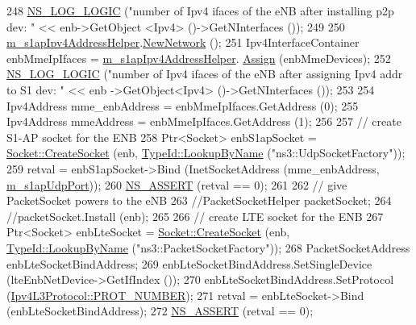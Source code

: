 \begin{DoxyCode}
248   \hyperlink{group__logging_ga88acd260151caf2db9c0fc84997f45ce}{NS\_LOG\_LOGIC} (\textcolor{stringliteral}{"number of Ipv4 ifaces of the eNB after installing p2p dev: "} << enb->GetObject
      <Ipv4> ()->GetNInterfaces ());  
249 
250   \hyperlink{classns3_1_1PointToPointEpcHelper_a0c26058a4a24008dbfe7023ebc6a00af}{m\_s1apIpv4AddressHelper}.\hyperlink{classns3_1_1Ipv4AddressHelper_a3277d133ef0d2669934a16a8206ba8e4}{NewNetwork} ();
251   Ipv4InterfaceContainer enbMmeIpIfaces = \hyperlink{classns3_1_1PointToPointEpcHelper_a0c26058a4a24008dbfe7023ebc6a00af}{m\_s1apIpv4AddressHelper}.
      \hyperlink{classns3_1_1Ipv4AddressHelper_af8e7f4a1a7e74c00014a1eac445a27af}{Assign} (enbMmeDevices);
252   \hyperlink{group__logging_ga88acd260151caf2db9c0fc84997f45ce}{NS\_LOG\_LOGIC} (\textcolor{stringliteral}{"number of Ipv4 ifaces of the eNB after assigning Ipv4 addr to S1 dev: "} << enb
      ->GetObject<Ipv4> ()->GetNInterfaces ());
253   
254   Ipv4Address mme\_enbAddress = enbMmeIpIfaces.GetAddress (0);
255   Ipv4Address mmeAddress = enbMmeIpIfaces.GetAddress (1);
256 
257   \textcolor{comment}{// create S1-AP socket for the ENB}
258   Ptr<Socket> enbS1apSocket = \hyperlink{classns3_1_1Socket_ad448a62bb50ad3dbac59c879a885a8d2}{Socket::CreateSocket} (enb, 
      \hyperlink{classns3_1_1TypeId_a119cf99c20931fdc294602cd360b180e}{TypeId::LookupByName} (\textcolor{stringliteral}{"ns3::UdpSocketFactory"}));
259   retval = enbS1apSocket->Bind (InetSocketAddress (mme\_enbAddress, \hyperlink{classns3_1_1PointToPointEpcHelper_a54827f1909b73bb956bb6f12e098c367}{m\_s1apUdpPort}));
260   \hyperlink{assert_8h_a6dccdb0de9b252f60088ce281c49d052}{NS\_ASSERT} (retval == 0);
261 
262   \textcolor{comment}{// give PacketSocket powers to the eNB}
263   \textcolor{comment}{//PacketSocketHelper packetSocket;}
264   \textcolor{comment}{//packetSocket.Install (enb); }
265   
266   \textcolor{comment}{// create LTE socket for the ENB }
267   Ptr<Socket> enbLteSocket = \hyperlink{classns3_1_1Socket_ad448a62bb50ad3dbac59c879a885a8d2}{Socket::CreateSocket} (enb, 
      \hyperlink{classns3_1_1TypeId_a119cf99c20931fdc294602cd360b180e}{TypeId::LookupByName} (\textcolor{stringliteral}{"ns3::PacketSocketFactory"}));
268   PacketSocketAddress enbLteSocketBindAddress;
269   enbLteSocketBindAddress.SetSingleDevice (lteEnbNetDevice->GetIfIndex ());
270   enbLteSocketBindAddress.SetProtocol (\hyperlink{classns3_1_1Ipv4L3Protocol_a0146bc84815b7b73adb9c62cdafc9442}{Ipv4L3Protocol::PROT\_NUMBER});
271   retval = enbLteSocket->Bind (enbLteSocketBindAddress);
272   \hyperlink{assert_8h_a6dccdb0de9b252f60088ce281c49d052}{NS\_ASSERT} (retval == 0);  

\end{DoxyCode}
